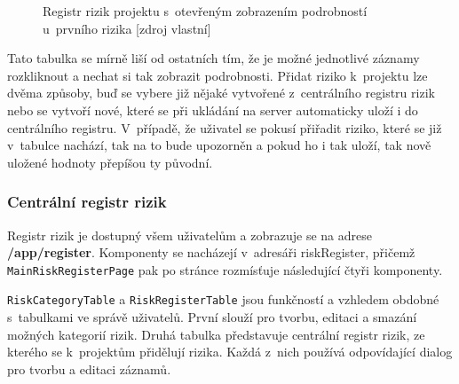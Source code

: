     \begin{figure}[!h]
    \begin{center}
    \caption{Registr rizik projektu s~otevřeným zobrazením podrobností u~prvního rizika [zdroj vlastní]}
    \label{registrRizikTable}
    \end{center}
    \end{figure}

Tato tabulka se mírně liší od ostatních tím, že je možné jednotlivé záznamy rozkliknout a nechat si tak zobrazit podrobnosti. Přidat riziko k~projektu lze dvěma způsoby, buď se vybere již nějaké vytvořené z~centrálního registru rizik nebo se vytvoří nové, které se při ukládání na server automaticky uloží i do centrálního registru. V~případě, že uživatel se pokusí přiřadit riziko, které se již v~tabulce nachází, tak na to bude upozorněn a pokud ho i tak uloží, tak nově uložené hodnoty přepíšou ty původní.


\subsubsection *{Centrální registr rizik}

Registr rizik je dostupný všem uživatelům a zobrazuje se na adrese \textbf{/app/register}. Komponenty se nacházejí v~adresáři riskRegister, přičemž \texttt{MainRiskRegisterPage} pak po stránce rozmísťuje následující čtyři komponenty. 

\texttt{RiskCategoryTable} a \texttt{RiskRegisterTable} jsou funkčností a vzhledem obdobné s~tabulkami ve správě uživatelů. První slouží pro tvorbu, editaci a smazání možných kategorií rizik. Druhá tabulka představuje centrální registr rizik, ze kterého se k~projektům přidělují rizika. Každá z~nich používá odpovídající dialog pro tvorbu a editaci záznamů.

